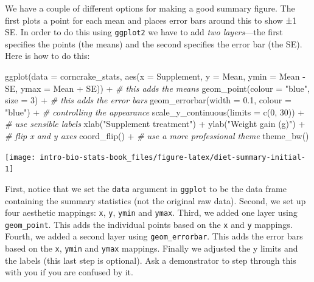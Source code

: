 \documentclass[
]{book}
\newenvironment{Shaded}{\begin{snugshade}}{\end{snugshade}}
\newcommand{\AttributeTok}[1]{\textcolor[rgb]{0.77,0.63,0.00}{#1}}
\newcommand{\CommentTok}[1]{\textcolor[rgb]{0.56,0.35,0.01}{\textit{#1}}}
\newcommand{\DecValTok}[1]{\textcolor[rgb]{0.00,0.00,0.81}{#1}}
\newcommand{\FloatTok}[1]{\textcolor[rgb]{0.00,0.00,0.81}{#1}}
\newcommand{\FunctionTok}[1]{\textcolor[rgb]{0.00,0.00,0.00}{#1}}
\newcommand{\NormalTok}[1]{#1}
\newcommand{\SpecialCharTok}[1]{\textcolor[rgb]{0.00,0.00,0.00}{#1}}
\newcommand{\StringTok}[1]{\textcolor[rgb]{0.31,0.60,0.02}{#1}}
\begin{document}
We have a couple of different options for making a good summary figure. The first plots a point for each mean and places error bars around this to show ±1 SE. In order to do this using \texttt{ggplot2} we have to add \emph{two layers}---the first specifies the points (the means) and the second specifies the error bar (the SE). Here is how to do this:

\begin{Shaded}
\begin{Highlighting}[]
\FunctionTok{ggplot}\NormalTok{(}\AttributeTok{data =}\NormalTok{ corncrake\_stats, }
       \FunctionTok{aes}\NormalTok{(}\AttributeTok{x =}\NormalTok{ Supplement, }\AttributeTok{y =}\NormalTok{ Mean, }\AttributeTok{ymin =}\NormalTok{ Mean }\SpecialCharTok{{-}}\NormalTok{ SE, }\AttributeTok{ymax =}\NormalTok{ Mean }\SpecialCharTok{+}\NormalTok{ SE)) }\SpecialCharTok{+} 
  \CommentTok{\# this adds the means}
  \FunctionTok{geom\_point}\NormalTok{(}\AttributeTok{colour =} \StringTok{"blue"}\NormalTok{, }\AttributeTok{size =} \DecValTok{3}\NormalTok{) }\SpecialCharTok{+} 
  \CommentTok{\# this adds the error bars}
  \FunctionTok{geom\_errorbar}\NormalTok{(}\AttributeTok{width =} \FloatTok{0.1}\NormalTok{, }\AttributeTok{colour =} \StringTok{"blue"}\NormalTok{) }\SpecialCharTok{+} 
  \CommentTok{\# controlling the appearance}
  \FunctionTok{scale\_y\_continuous}\NormalTok{(}\AttributeTok{limits =} \FunctionTok{c}\NormalTok{(}\DecValTok{0}\NormalTok{, }\DecValTok{30}\NormalTok{)) }\SpecialCharTok{+} 
  \CommentTok{\# use sensible labels}
  \FunctionTok{xlab}\NormalTok{(}\StringTok{"Supplement treatment"}\NormalTok{) }\SpecialCharTok{+} \FunctionTok{ylab}\NormalTok{(}\StringTok{"Weight gain (g)"}\NormalTok{) }\SpecialCharTok{+}
  \CommentTok{\# flip x and y axes}
  \FunctionTok{coord\_flip}\NormalTok{() }\SpecialCharTok{+}
  \CommentTok{\# use a more professional theme}
  \FunctionTok{theme\_bw}\NormalTok{()}
\end{Highlighting}
\end{Shaded}

\begin{center}\texttt{[image: intro-bio-stats-book\_files/figure-latex/diet-summary-initial-1]} \end{center}

First, notice that we set the \texttt{data} argument in \texttt{ggplot} to be the data frame containing the summary statistics (not the original raw data). Second, we set up four aesthetic mappings: \texttt{x}, \texttt{y}, \texttt{ymin} and \texttt{ymax}. Third, we added one layer using \texttt{geom\_point}. This adds the individual points based on the \texttt{x} and \texttt{y} mappings. Fourth, we added a second layer using \texttt{geom\_errorbar}. This adds the error bars based on the \texttt{x}, \texttt{ymin} and \texttt{ymax} mappings. Finally we adjusted the y limits and the labels (this last step is optional). Ask a demonstrator to step through this with you if you are confused by it.
\end{document}
